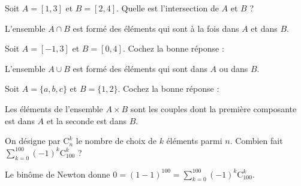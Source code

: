 \begin{question}
Soit $A=[1,3]$ et $B=[2,4]$. Quelle est l'intersection de $A$ et $B$ ?
\begin{answers}  
\end{answers}
\begin{explanations}
L'ensemble $A\cap B$ est formé des éléments qui sont à la fois dans $A$ et dans $B$.
\end{explanations}
\end{question}


\begin{question}
Soit $A=[-1,3]$ et $B=[0,4]$. Cochez la bonne réponse :
\begin{answers}  
\end{answers}
\begin{explanations}
L'ensemble $A\cup B$ est formé des éléments qui sont dans $A$ ou dans $B$.
\end{explanations}
\end{question}


\begin{question}
Soit $A=\{a,b,c\}$ et $B=\{1,2\}$. Cochez la bonne réponse :
\begin{answers}  
\end{answers}
\begin{explanations}
Les éléments de l'ensemble $A\times B$ sont les couples dont la première composante est dans $A$ et la seconde est dans $B$.
\end{explanations}
\end{question}


\begin{question}
On désigne par $\mathrm{C}^k_n$ le nombre de choix de $k$ éléments parmi $n$. Combien fait $\displaystyle \sum _{k=0}^{100}(-1)^k\mathrm{C}^k_{100}$ ?
\begin{answers}  
\end{answers}
\begin{explanations}
Le binôme de Newton donne $\displaystyle 0=(1-1)^{100}=\sum _{k=0}^{100}(-1)^k\mathrm{C}^k_{100}$.
\end{explanations}
\end{question}

